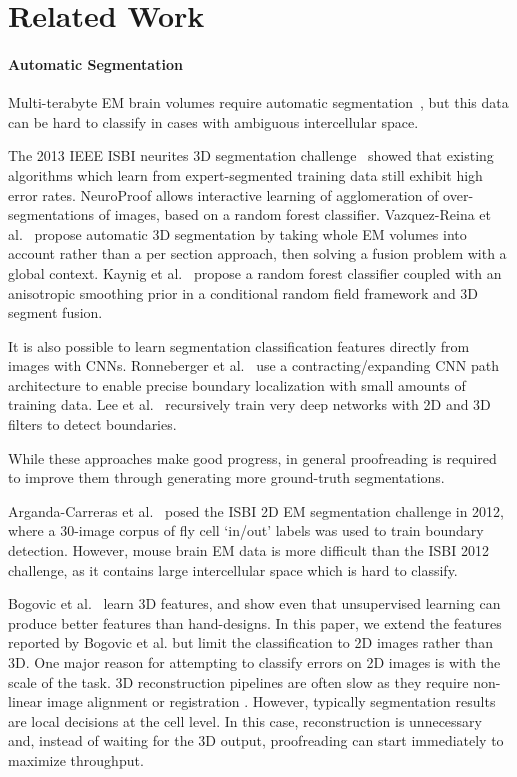 \section{Related Work}

\paragraph{Automatic Segmentation}

Multi-terabyte EM brain volumes require automatic segmentation~\cite{jain2010,kaynig10,Liu2014,NunezIglesias2013Machine,GALA2014,amelio_segmentation}, but this data can be hard to classify in cases with ambiguous intercellular space. 

The 2013 IEEE ISBI neurites 3D segmentation challenge~\cite{isbi_challenge} showed that existing algorithms which learn from expert-segmented training data still exhibit high error rates. NeuroProof \cite{neuroproof2013} allows interactive learning of agglomeration of over-segmentations of images, based on a random forest classifier. Vazquez-Reina et al.~\cite{amelio_segmentation} propose automatic 3D segmentation by taking whole EM volumes into account rather than a per section approach, then solving a fusion problem with a global context. Kaynig et al.~\cite{kaynig10} propose a random forest classifier coupled with an anisotropic smoothing prior in a conditional random field framework and 3D segment fusion. 

It is also possible to learn segmentation classification features directly from images with CNNs. Ronneberger et al.~\cite{RonnebergerFB15} use a contracting/expanding CNN path architecture to enable precise boundary localization with small amounts of training data. Lee et al.~\cite{lee2015recursive} recursively train very deep networks with 2D and 3D filters to detect boundaries. 

While these approaches make good progress, in general proofreading is required to improve them through generating more ground-truth segmentations.

Arganda-Carreras et al.~\cite{10.3389/fnana.2015.00142} posed the ISBI 2D EM segmentation challenge in 2012, where a 30-image corpus of fly cell `in/out' labels was used to train boundary detection. However, mouse brain EM data is more difficult than the ISBI 2012 challenge, as it contains large intercellular space which is hard to classify. 

Bogovic et al.~\cite{BogovicHJ13} learn 3D features, and show even that unsupervised learning can produce better features than hand-designs. In this paper, we extend the features reported by Bogovic et al. but limit the classification to 2D images rather than 3D. One major reason for attempting to classify errors on 2D images is with the scale of the task. 3D reconstruction pipelines are often slow as they require non-linear image alignment or registration \cite{akselrod09,beyer13,Saalfeld2010Asrigidaspossible}. However, typically segmentation results are local decisions at the cell level. In this case, reconstruction is unnecessary and, instead of waiting for the 3D output, proofreading can start immediately to maximize throughput.

